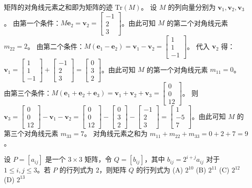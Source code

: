 \begin{questions}
\begin{solution}
矩阵的对角线元素之和即为矩阵的迹 $\text{Tr}(M)$。
设 $M$ 的列向量分别为 $\mathbf{v}_1, \mathbf{v}_2, \mathbf{v}_3$。
由第一个条件：$M \mathbf{e}_2 = \mathbf{v}_2 = \begin{bmatrix} -1 \\ 2 \\ 3 \end{bmatrix}$。由此可知 $M$ 的第二个对角线元素 $m_{22} = 2$。
由第二个条件：$M(\mathbf{e}_1 - \mathbf{e}_2) = \mathbf{v}_1 - \mathbf{v}_2 = \begin{bmatrix} 1 \\ 1 \\ -1 \end{bmatrix}$。
代入 $\mathbf{v}_2$ 得：$\mathbf{v}_1 = \begin{bmatrix} 1 \\ 1 \\ -1 \end{bmatrix} + \begin{bmatrix} -1 \\ 2 \\ 3 \end{bmatrix} = \begin{bmatrix} 0 \\ 3 \\ 2 \end{bmatrix}$。由此可知 $M$ 的第一个对角线元素 $m_{11} = 0$。
由第三个条件：$M(\mathbf{e}_1 + \mathbf{e}_2 + \mathbf{e}_3) = \mathbf{v}_1 + \mathbf{v}_2 + \mathbf{v}_3 = \begin{bmatrix} 0 \\ 0 \\ 12 \end{bmatrix}$。
则 $\mathbf{v}_3 = \begin{bmatrix} 0 \\ 0 \\ 12 \end{bmatrix} - \mathbf{v}_1 - \mathbf{v}_2 = \begin{bmatrix} 0 \\ 0 \\ 12 \end{bmatrix} - \begin{bmatrix} 0 \\ 3 \\ 2 \end{bmatrix} - \begin{bmatrix} -1 \\ 2 \\ 3 \end{bmatrix} = \begin{bmatrix} 1 \\ -5 \\ 7 \end{bmatrix}$。由此可知 $M$ 的第三个对角线元素 $m_{33} = 7$。
对角线元素之和为 $m_{11} + m_{22} + m_{33} = 0 + 2 + 7 = 9$。
\end{solution}
    \question 设 $P = [a_{ij}]$ 是一个 $3 \times 3$ 矩阵，令 $Q = [b_{ij}]$，其中 $b_{ij} = 2^{i+j} a_{ij}$ 对于 $1 \le i, j \le 3$。若 $P$ 的行列式为 $2$，则矩阵 $Q$ 的行列式为
(A) $2^{10}$
(B) $2^{11}$
(C) $2^{12}$
(D) $2^{13}$


\end{questions}
